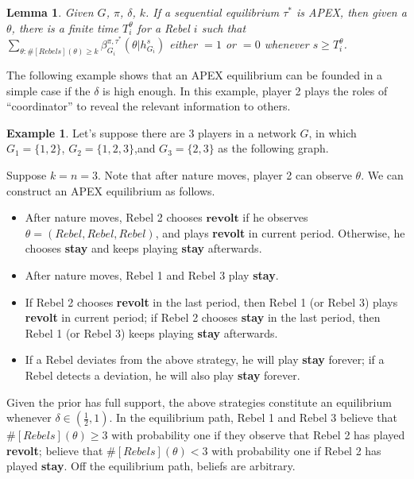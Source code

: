 \documentclass[12pt,letterpaper]{article}
\newtheorem*{main result}{Main Result}
\newtheorem{lemma}{Lemma}[section]
\theoremstyle{definition}
\newtheorem{example}{Example}[section]
\theoremstyle{remark}
\theoremstyle{claim}
\begin{document}
\begin{lemma}\label{lemma_learn}
Given $G$, $\pi$, $\delta$, $k$. If a sequential equilibrium $\tau^*$ is APEX, then given a $\theta$, there is a finite time $T^{\theta}_i$ for a Rebel $i$ such that $\sum_{\theta:\#[Rebels](\theta)\geq k}\beta^{\pi,\tau^*}_{G_i}(\theta|h^{s}_{G_i})$ either $=1$ or $=0$
whenever $s\geq T^{\theta}_i$.
\end{lemma}


The following example shows that an APEX equilibrium can be founded in a simple case if the $\delta$ is high enough. In this example, player 2 plays the roles of ``coordinator'' to reveal the relevant information to others.
\begin{example}\label{ex_leading_ex}
Let's suppose there are 3 players in a network $G$, in which $G_1=\{1,2\}$, $G_2=\{1,2,3\}$,and $G_3=\{2,3\}$ as the following graph.

\begin{center}
\end{center}

Suppose $k=n=3$. Note that after nature moves, player 2 can observe $\theta$.  We can construct an APEX equilibrium as follows.

\begin{itemize}
\item After nature moves, Rebel 2 chooses $\textbf{revolt}$ if he observes $\theta=(Rebel,Rebel,Rebel)$, and plays \textbf{revolt} in current period. Otherwise, he chooses \textbf{stay} and keeps playing \textbf{stay} afterwards. 
\item After nature moves, Rebel 1 and Rebel 3 play \textbf{stay}.
\item If Rebel 2 chooses \textbf{revolt} in the last period, then Rebel 1 (or Rebel 3) plays \textbf{revolt} in current period; if Rebel 2 chooses \textbf{stay} in the last period, then Rebel 1 (or Rebel 3) keeps playing \textbf{stay} afterwards. 
\item If a Rebel deviates from the above strategy, he will play \textbf{stay} forever; if a Rebel detects a deviation, he will also play \textbf{stay} forever.
\end{itemize}

Given the prior has full support, the above strategies constitute an equilibrium  whenever $\delta\in (\frac{1}{2},1)$. In the equilibrium path, Rebel 1 and Rebel 3 believe that $\#[Rebels](\theta)\geq 3$ with probability one if they observe that Rebel 2 has played \textbf{revolt}; believe that $\#[Rebels](\theta)< 3$ with probability one if Rebel 2 has played \textbf{stay}. Off the equilibrium path, beliefs are arbitrary.
\end{example}
\end{document}
